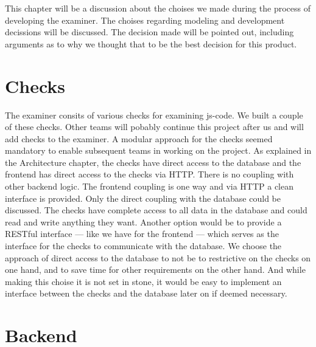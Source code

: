 %

This chapter will be a discussion about the choises we made
during the process of developing the \gls{examiner}.
The choises regarding modeling and development decissions will be discussed.
The decision made will be pointed out,
including arguments as to why we thought
that to be the best decision for this product.

\section{Checks}
The \gls{examiner} consits of various \glspl{check} for examining \gls{js-code}.
We built a couple of these \glspl{check}.
Other teams will pobably continue this project after us
and will add \glspl{check} to the \gls{examiner}.
A modular approach for the \glspl{check} seemed mandatory to enable
subsequent teams in working on the project.
As explained in the Architecture chapter,
the \glspl{check} have direct access to the database
and the frontend has direct access to the \glspl{check} via HTTP.
There is no coupling with other backend logic.
The frontend coupling is one way
and via HTTP a clean interface is provided.
Only the direct coupling with the database could be discussed.
The \glspl{check} have complete access to all data in the database
and could read and write anything they want.
Another option would be to provide a RESTful interface ---
like we have for the frontend ---
which serves as the interface for the \glspl{check} to communicate with the database.
We choose the approach of direct access to the database
to not be to restrictive on the \glspl{check} on one hand,
and to save time for other requirements on the other hand.
And while making this choise it is not set in stone,
it would be easy to implement an interface
between the \glspl{check} and the database later on if deemed necessary.

\section{Backend}

